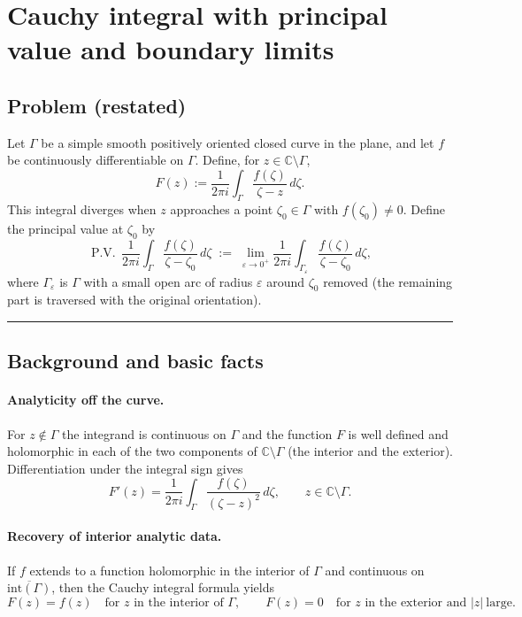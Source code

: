 \documentclass[11pt]{article}
\begin{document}
	
	

\section*{Cauchy integral with principal value and boundary limits}

\subsection*{Problem (restated)}
Let $\Gamma$ be a simple smooth positively oriented closed curve in the plane, and let $f$ be continuously differentiable on $\Gamma$.
Define, for $z\in\mathbb{C}\setminus\Gamma$,
\[
F(z):=\frac{1}{2\pi i}\int_{\Gamma}\frac{f(\zeta)}{\zeta-z}\,d\zeta .
\]
This integral diverges when $z$ approaches a point $\zeta_0\in\Gamma$ with $f(\zeta_0)\neq 0$.
Define the principal value at $\zeta_0$ by
\[
\operatorname{P.V.}\,\frac{1}{2\pi i}\int_{\Gamma}\frac{f(\zeta)}{\zeta-\zeta_0}\,d\zeta
\;:=\;
\lim_{\varepsilon\to 0^+}\frac{1}{2\pi i}
\int_{\Gamma_\varepsilon}\frac{f(\zeta)}{\zeta-\zeta_0}\,d\zeta,
\]
where $\Gamma_\varepsilon$ is $\Gamma$ with a small open arc of radius $\varepsilon$ around $\zeta_0$ removed (the remaining part is traversed with the original orientation).

\bigskip\hrule\bigskip

\subsection*{Background and basic facts}

\paragraph{Analyticity off the curve.}
For $z\notin\Gamma$ the integrand is continuous on $\Gamma$ and the function $F$ is well defined and holomorphic in each of the two components of $\mathbb{C}\setminus\Gamma$ (the interior and the exterior).
Differentiation under the integral sign gives
\[
F'(z)=\frac{1}{2\pi i}\int_{\Gamma}\frac{f(\zeta)}{(\zeta-z)^2}\,d\zeta,
\qquad z\in\mathbb{C}\setminus\Gamma.
\]

\paragraph{Recovery of interior analytic data.}
If $f$ extends to a function holomorphic in the interior of $\Gamma$ and continuous on $\overline{\mathrm{int}(\Gamma)}$, then the Cauchy integral formula yields
\[
F(z)=f(z)\quad\text{for }z\text{ in the interior of }\Gamma,
\qquad
F(z)=0\quad\text{for }z\text{ in the exterior and }|z|\ \text{large}.
\]
\end{document}
